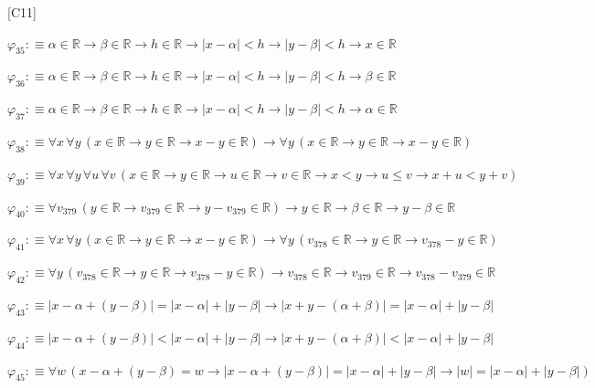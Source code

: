 \begin{fullproof}{[C11]}
\begin{abbrevlist}
\item $\varphi_{35} :\equiv \alpha \in \mathbb{R} \to \beta \in \mathbb{R} \to h \in \mathbb{R} \to \lvert x - \alpha \rvert < h \to \lvert y - \beta \rvert < h \to x \in \mathbb{R}$
\item $\varphi_{36} :\equiv \alpha \in \mathbb{R} \to \beta \in \mathbb{R} \to h \in \mathbb{R} \to \lvert x - \alpha \rvert < h \to \lvert y - \beta \rvert < h \to \beta \in \mathbb{R}$
\item $\varphi_{37} :\equiv \alpha \in \mathbb{R} \to \beta \in \mathbb{R} \to h \in \mathbb{R} \to \lvert x - \alpha \rvert < h \to \lvert y - \beta \rvert < h \to \alpha \in \mathbb{R}$
\item $\varphi_{38} :\equiv \forall x\,\forall y\,(x \in \mathbb{R} \to y \in \mathbb{R} \to x - y \in \mathbb{R}) \to \forall y\,(x \in \mathbb{R} \to y \in \mathbb{R} \to x - y \in \mathbb{R})$
\item $\varphi_{39} :\equiv \forall x\,\forall y\,\forall u\,\forall v\,(x \in \mathbb{R} \to y \in \mathbb{R} \to u \in \mathbb{R} \to v \in \mathbb{R} \to x < y \to u \leq v \to x + u < y + v)$
\item $\varphi_{40} :\equiv \forall v_{379}\,(y \in \mathbb{R} \to v_{379} \in \mathbb{R} \to y - v_{379} \in \mathbb{R}) \to y \in \mathbb{R} \to \beta \in \mathbb{R} \to y - \beta \in \mathbb{R}$
\item $\varphi_{41} :\equiv \forall x\,\forall y\,(x \in \mathbb{R} \to y \in \mathbb{R} \to x - y \in \mathbb{R}) \to \forall y\,(v_{378} \in \mathbb{R} \to y \in \mathbb{R} \to v_{378} - y \in \mathbb{R})$
\item $\varphi_{42} :\equiv \forall y\,(v_{378} \in \mathbb{R} \to y \in \mathbb{R} \to v_{378} - y \in \mathbb{R}) \to v_{378} \in \mathbb{R} \to v_{379} \in \mathbb{R} \to v_{378} - v_{379} \in \mathbb{R}$
\item $\varphi_{43} :\equiv \lvert x - \alpha + (y - \beta) \rvert = \lvert x - \alpha \rvert + \lvert y - \beta \rvert \to \lvert x + y - (\alpha + \beta) \rvert = \lvert x - \alpha \rvert + \lvert y - \beta \rvert$
\item $\varphi_{44} :\equiv \lvert x - \alpha + (y - \beta) \rvert < \lvert x - \alpha \rvert + \lvert y - \beta \rvert \to \lvert x + y - (\alpha + \beta) \rvert < \lvert x - \alpha \rvert + \lvert y - \beta \rvert$
\item $\varphi_{45} :\equiv \forall w\,(x - \alpha + (y - \beta) = w \to \lvert x - \alpha + (y - \beta) \rvert = \lvert x - \alpha \rvert + \lvert y - \beta \rvert \to \lvert w \rvert = \lvert x - \alpha \rvert + \lvert y - \beta \rvert)$

\end{abbrevlist}
\end{fullproof}
